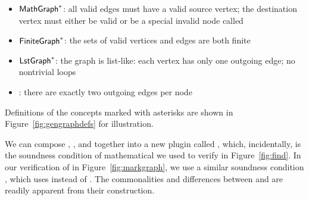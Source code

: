 \begin{itemize}
\vspace{-1ex}
\item $\mathsf{MathGraph}^{*}$: all valid edges must have a valid source vertex; the destination
vertex must either be valid or be a special invalid node called 
\item $\mathsf{FiniteGraph}^{*}$: the sets of valid vertices and edges are both finite
\item $\mathsf{LstGraph}^{*}$: the graph is list-like: each vertex has only one outgoing edge; no nontrivial loops
\item {}: there are exactly two outgoing edges per node
\end{itemize}
Definitions of the concepts marked with asterisks are
shown in Figure~\ref{fig:gengraphdefs} for illustration.

We can compose
, , and 
together into a new plugin called , which, incidentally, is
the soundness condition of mathematical 
we used to verify  in
Figure~\ref{fig:find}.  In our verification of  in
Figure~\ref{fig:markgraph}, we use a similar soundness condition
, which uses  instead of .
The commonalities and differences between 
and  are readily apparent from their construction.

\iffalse
\marginpar{\tiny \color{blue} Maybe move this somewhere.}
{\color{magenta}Coq also handles our notion of inherited
lemmas seamlessly: in our verfication of Find, we
work directly with a \p{LiMaFin} GeneralGraph, but, as
we saw, we still use properties such as reachability
and operations such as selective subtraction, which are defined on the
embedded PreGraph, not the GeneralGraph.
Coq handles the appropriate coercions with
remarkable elegance.}
\fi

